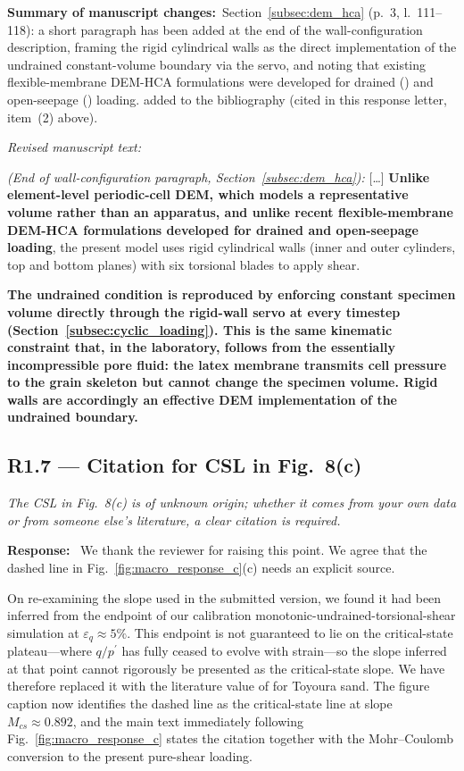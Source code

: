 \documentclass[11pt,a4paper]{article}
\newenvironment{rcomment}
  {\begin{leftbar}\color{black!75}\itshape}
  {\end{leftbar}\vspace{0.3em}}
\newcommand{\response}{\par\noindent\textbf{Response:}\ \ignorespaces}
\newcommand{\changed}[1]{\par\noindent\textbf{Summary of manuscript changes:}\ #1\par}
\newenvironment{revtext}
  {\par\vspace{0.2em}\noindent\textit{Revised manuscript text:}\par
   \begingroup\color{black}\begin{leftbar}\small}
  {\end{leftbar}\endgroup\vspace{0.3em}}
\newcommand{\manref}[1]{(#1)}                  %
\begin{document}
\changed{Section~\ref{subsec:dem_hca} \manref{p.~3, l.~111--118}:
a short paragraph has been added at the end of the wall-configuration
description, framing the rigid cylindrical walls as the direct
implementation of the undrained constant-volume boundary via the
servo, and noting that existing flexible-membrane DEM-HCA formulations
were developed for drained (\citealp{Song2024}) and open-seepage
(\citealp{Song2024suffusion}) loading.
\citet{DesruesViggiani2004} added to the bibliography (cited in
this response letter, item~(2) above).}

\begin{revtext}
\textit{(End of wall-configuration paragraph,
Section~\ref{subsec:dem_hca}):} [\ldots] \textbf{Unlike element-level
periodic-cell DEM, which models a representative volume rather than
an apparatus, and unlike recent flexible-membrane DEM-HCA
formulations \citep{Song2024,Song2024suffusion} developed for drained
and open-seepage loading}, the present model uses rigid cylindrical
walls (inner and outer cylinders, top and bottom planes) with six
torsional blades to apply shear.
\medskip

\textbf{The undrained condition is reproduced by enforcing constant
specimen volume directly through the rigid-wall servo at every
timestep (Section~\ref{subsec:cyclic_loading}). This is the same
kinematic constraint that, in the laboratory, follows from the
essentially incompressible pore fluid: the latex membrane transmits
cell pressure to the grain skeleton but cannot change the specimen
volume. Rigid walls are accordingly an effective DEM implementation
of the undrained boundary.}
\end{revtext}

\subsection*{R1.7 --- Citation for CSL in Fig.~8(c)}

\begin{rcomment}
The CSL in Fig.~8(c) is of unknown origin; whether it comes from your own
data or from someone else's literature, a clear citation is required.
\end{rcomment}

\response
We thank the reviewer for raising this point. We agree that the
dashed line in Fig.~\ref{fig:macro_response_c}(c) needs an explicit
source.

On re-examining the slope used in the submitted version, we found
it had been inferred from the endpoint of our calibration
monotonic-undrained-torsional-shear simulation at
$\varepsilon_q\approx 5\%$. This endpoint is not guaranteed to lie
on the critical-state plateau---where $q/p^{\prime}$ has fully ceased
to evolve with strain---so the slope inferred at that point cannot
rigorously be presented as the critical-state slope. We have
therefore replaced it with the literature value of
\citet{VerdugoIshihara1996} for Toyoura sand. The figure caption
now identifies the dashed line as the critical-state line at slope
$M_{cs}\approx 0.892$, and the main text immediately following
Fig.~\ref{fig:macro_response_c} states the citation together with
the Mohr--Coulomb conversion to the present pure-shear loading.
\end{document}
